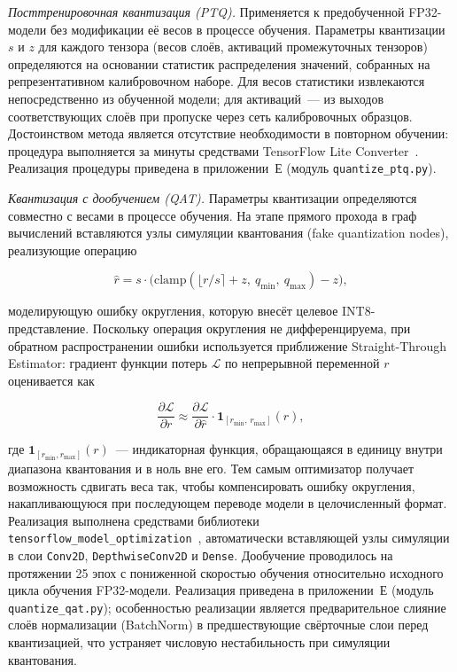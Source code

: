 \textit{Посттренировочная квантизация (PTQ).} Применяется к
предобученной FP32-модели без модификации её весов в процессе обучения.
Параметры квантизации $s$ и $z$ для каждого тензора (весов слоёв,
активаций промежуточных тензоров) определяются на основании статистик
распределения значений, собранных на репрезентативном калибровочном
наборе. Для весов статистики извлекаются непосредственно из
обученной модели; для активаций~--- из выходов соответствующих слоёв
при пропуске через сеть калибровочных образцов. Достоинством метода
является отсутствие необходимости в повторном обучении: процедура
выполняется за минуты средствами TensorFlow Lite
Converter~\cite{src:4}. Реализация процедуры приведена в
приложении~Е (модуль \texttt{quantize\_ptq.py}).

\textit{Квантизация с дообучением (QAT).} Параметры квантизации
определяются совместно с весами в процессе обучения. На этапе прямого
прохода в граф вычислений вставляются узлы симуляции квантования (fake
quantization nodes), реализующие операцию

\begin{equation}
	\hat{r} = s \cdot \bigl(\mathrm{clamp}\!\left(\lfloor r/s \rceil + z,\ q_{\min},\ q_{\max}\right) - z\bigr),
	\label{eq:fake_quant}
\end{equation}

моделирующую ошибку округления, которую внесёт целевое INT8-представление.
Поскольку операция округления не дифференцируема, при обратном
распространении ошибки используется приближение Straight-Through
Estimator: градиент функции потерь $\mathcal{L}$ по непрерывной
переменной $r$ оценивается как

\begin{equation}
	\frac{\partial \mathcal{L}}{\partial r} \approx \frac{\partial \mathcal{L}}{\partial \hat{r}} \cdot \mathbf{1}_{[r_{\min},\, r_{\max}]}(r),
	\label{eq:ste}
\end{equation}

где $\mathbf{1}_{[r_{\min}, r_{\max}]}(r)$~--- индикаторная функция,
обращающаяся в единицу внутри диапазона квантования и в ноль вне его.
Тем самым оптимизатор получает возможность сдвигать веса так, чтобы
компенсировать ошибку округления, накапливающуюся при последующем
переводе модели в целочисленный формат. Реализация выполнена средствами
библиотеки \texttt{tensorflow\_model\_optimization}~\cite{src:22},
автоматически вставляющей узлы симуляции в слои \texttt{Conv2D},
\texttt{DepthwiseConv2D} и \texttt{Dense}. Дообучение проводилось на
протяжении 25 эпох с пониженной скоростью обучения относительно
исходного цикла обучения FP32-модели. Реализация приведена в
приложении~Е (модуль \texttt{quantize\_qat.py}); особенностью
реализации является предварительное слияние слоёв нормализации
(BatchNorm) в предшествующие свёрточные слои перед квантизацией,
что устраняет числовую нестабильность при симуляции квантования.


